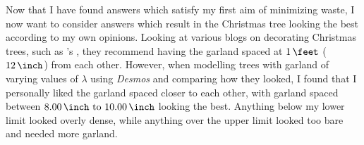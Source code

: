 \begin{table}[H]
    \centering
    \singlespacing
    \setlength{\tabcolsep}{10pt}
    \caption{Values of $\lambda$ and associated computations, with less than $\US{12}{\inch}$ of excess garland.  All values below are measured in \textbf{inches} and sorted by amount of excess garland in increasing order}
\end{table}

Now that I have found answers which satisfy my first aim of minimizing waste, I now want to consider answers which result in the Christmas tree looking the best according to my own opinions. Looking at various blogs on decorating Christmas trees, such as \citeauthor{rooneyHowString2019}'s , they recommend having the garland spaced at $\US{1}{\feet}$ ($\US{12}{\inch}$) from each other. However, when modelling trees with garland of varying values of $\lambda$ using \emph{Desmos} and comparing how they looked, I found that I personally liked the garland spaced closer to each other, with garland spaced between $\qtyrange{8.00}{10.00}{\inch}$ looking the best. Anything below my lower limit looked overly dense, while anything over the upper limit looked too bare and needed more garland. 

